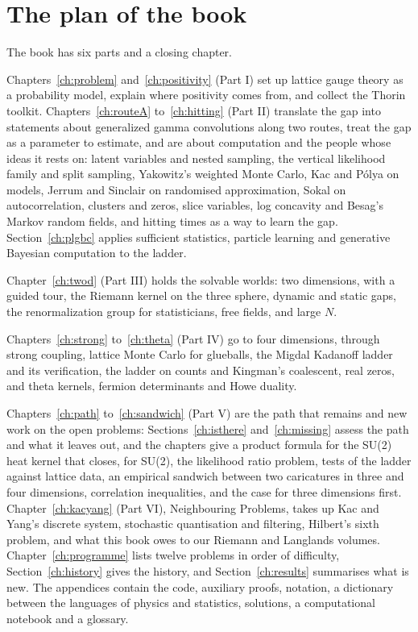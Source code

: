 \section{The plan of the book}

The book has six parts and a closing chapter.

Chapters~\ref{ch:problem} and~\ref{ch:positivity} (Part I) set up lattice gauge theory as a probability model, explain where positivity comes from, and collect the Thorin toolkit. Chapters~\ref{ch:routeA} to~\ref{ch:hitting} (Part II) translate the gap into statements about generalized gamma convolutions along two routes, treat the gap as a parameter to estimate, and are about computation and the people whose ideas it rests on: latent variables and nested sampling, the vertical likelihood family and split sampling, Yakowitz's weighted Monte Carlo, Kac and P\'olya on models, Jerrum and Sinclair on randomised approximation, Sokal on autocorrelation, clusters and zeros, slice variables, log concavity and Besag's Markov random fields, and hitting times as a way to learn the gap. Section~\ref{ch:plgbc} applies sufficient statistics, particle learning and generative Bayesian computation to the ladder.

Chapter~\ref{ch:twod} (Part III) holds the solvable worlds: two dimensions, with a guided tour, the Riemann kernel on the three sphere, dynamic and static gaps, the renormalization group for statisticians, free fields, and large $N$.

Chapters~\ref{ch:strong} to~\ref{ch:theta} (Part IV) go to four dimensions, through strong coupling, lattice Monte Carlo for glueballs, the Migdal Kadanoff ladder and its verification, the ladder on counts and Kingman's coalescent, real zeros, and theta kernels, fermion determinants and Howe duality.

Chapters~\ref{ch:path} to~\ref{ch:sandwich} (Part V) are the path that remains and new work on the open problems: Sections~\ref{ch:isthere} and~\ref{ch:missing} assess the path and what it leaves out, and the chapters give a product formula for the SU(2) heat kernel that closes, for SU(2), the likelihood ratio problem, tests of the ladder against lattice data, an empirical sandwich between two caricatures in three and four dimensions, correlation inequalities, and the case for three dimensions first. Chapter~\ref{ch:kacyang} (Part VI), Neighbouring Problems, takes up Kac and Yang's discrete system, stochastic quantisation and filtering, Hilbert's sixth problem, and what this book owes to our Riemann and Langlands volumes. Chapter~\ref{ch:programme} lists twelve problems in order of difficulty, Section~\ref{ch:history} gives the history, and Section~\ref{ch:results} summarises what is new. The appendices contain the code, auxiliary proofs, notation, a dictionary between the languages of physics and statistics, solutions, a computational notebook and a glossary.

